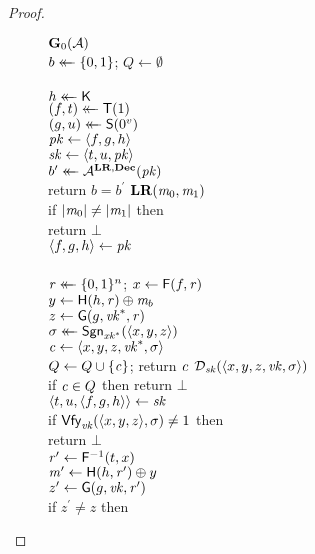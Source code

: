 \begin{proof}
  \begin{figure}
    \superGame %
    {
      \underline{$\mathbf{G}_0(\mathcal{A})$}\\[2pt]
        $b \mathrel{\leftarrow\mkern-14mu\leftarrow} \{0,1\}$; $Q \gets \emptyset$\\
        \diffplus{$(\vk^*, \xk^*) \getsr \siggen$}\\
        $h \mathrel{\leftarrow\mkern-14mu\leftarrow} \mathsf{K}$\\
        $(f, t) \mathrel{\leftarrow\mkern-14mu\leftarrow} \mathsf{T}(1)$\\
        $(g, u) \mathrel{\leftarrow\mkern-14mu\leftarrow} \mathsf{S}(0^v)$\\
        $\mathit{pk} \gets \langle f, g, h \rangle$\\
        $\mathit{sk} \gets \langle t, u, \mathit{pk} \rangle$\\
        $b^\prime \mathrel{\leftarrow\mkern-14mu\leftarrow} \mathcal{A}^{\mathbf{LR},\mathbf{Dec}}(\mathit{pk})$\\
        return $b=b^\prime$
    }
    {
      \underline{$\mathbf{LR}(\mathit{m}_0, \mathit{m}_1)$}\\[2pt]
        if $|\mathit{m}_0| \ne |\mathit{m}_1|$ then\\
          \tab return $\bot$\\
        $\langle f, g, h \rangle \gets \mathit{pk}$\\
        \diffminus{$(\vk^*, \xk^*) \getsr \siggen$}\\
        $\mathit{r} \mathrel{\leftarrow\mkern-14mu\leftarrow} \{0,1\}^n$;
        $x \gets \mathsf{F}(f,\mathit{r})$\\
        $y \gets \mathsf{H}(h,\mathit{r}) \oplus \mathit{m}_b$\\
        $z \gets \mathsf{G}(g, \mathit{vk}^*, \mathit{r})$\\
        $\sigma \mathrel{\leftarrow\mkern-14mu\leftarrow} \mathsf{Sgn}_{\mathit{xk}^*}(\langle x,y,z \rangle)$\\
        $\mathit{c} \gets \langle x,y,z,\mathit{vk}^*,\sigma \rangle$\\
        $Q \gets Q \cup \{\mathit{c}\}$;
        return $\mathit{c}$
    }
    {
      \underline{$\mathcal{D}_{\mathit{sk}}(\langle x,y,z,\mathit{vk},\sigma \rangle)$}
          \hfill {}\\[2pt]
        if $\mathit{c} \in Q$ then return $\bot$\\
        $\langle t, u, \langle f, g, h \rangle \rangle \gets \mathit{sk}$\\
        if $\mathsf{Vfy}_{\mathit{vk}}(\langle x,y,z \rangle,\sigma) \ne 1$ then\\
        \tab return $\bot$\\
        $\mathit{r}^\prime \gets \mathsf{F}^{-1}(t, x)$\\
        $\mathit{m}^\prime \gets \mathsf{H}(h,\mathit{r}^\prime) \oplus y$\\
        $z^\prime \gets \mathsf{G}(g,\mathit{vk},\mathit{r}^\prime)$\\
        if $z^\prime \ne z$ then
}
\end{figure}
\end{proof}
